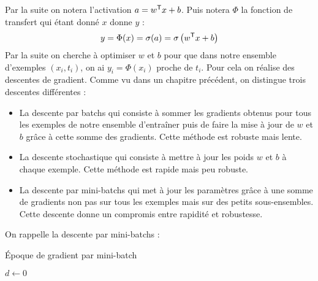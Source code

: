 Par la suite on notera l'activation $a = w^{\mathsf{T}} x + b$. Puis notera $\Phi$ la fonction de transfert qui étant donné $x$ donne $y$ :
$$ y = \Phi(x) = \sigma(a) = \sigma \left( w^{\mathsf{T}} x + b \right) $$
Par la suite on cherche à optimiser $w$ et $b$ pour que dans notre ensemble d'exemples $(x_i, t_i)$, on ai $y_i = \Phi(x_i)$ proche de $t_i$. Pour cela on réalise des descentes de gradient. Comme vu dans un chapitre précédent, on distingue trois descentes différentes :
\begin{itemize}
	\item La descente par batchs qui consiste à sommer les gradients obtenus pour tous les exemples de notre ensemble d'entraîner puis de faire la mise à jour de $w$ et $b$ grâce à cette somme des gradients. Cette méthode est robuste mais lente.
	\item La descente stochastique qui consiste à mettre à jour les poids $w$ et $b$ à chaque exemple. Cette méthode est rapide mais peu robuste.
	\item La descente par mini-batchs qui met à jour les paramètres grâce à une somme de gradients non pas sur tous les exemples mais sur des petits sous-ensembles. Cette descente donne un compromis entre rapidité et robustesse.
\end{itemize}
On rappelle la descente par mini-batchs : \\
\begin{algorithm}
	\caption{Époque de gradient par mini-batch}
	\DontPrintSemicolon
	$d \gets 0$ \;
\end{algorithm}

